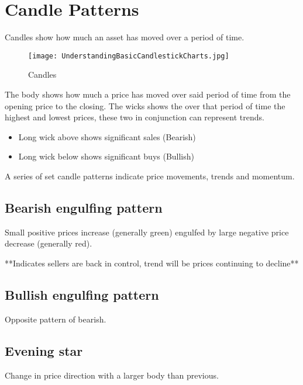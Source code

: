\documentclass[11pt]{scrartcl} %
\begin{document}
\section{Candle Patterns}

Candles show how much an asset has moved over a period of time. 

\begin{figure}[t] %
	\centering
	\texttt{[image: UnderstandingBasicCandlestickCharts.jpg]} %
	\caption{Candles}
\end{figure}

The body shows how much a price has moved over said period of time from the opening price to the 
closing. The wicks shows the over that period of time the highest and lowest prices, 
these two in conjunction can represent trends.

\begin{itemize}
	\item Long wick above shows significant sales (Bearish)
	\item Long wick below shows significant buys (Bullish)
\end{itemize}

A series of set candle patterns indicate price movements, trends and momentum.

\subsection{Bearish engulfing pattern}

Small positive prices increase (generally green) engulfed by large negative price decrease 
(generally red). 

**Indicates sellers are back in control, trend will be prices continuing to decline**

\subsection{Bullish engulfing pattern}

Opposite pattern of bearish.

\subsection{Evening star} 

Change in price direction with a larger body than previous.
\end{document}
